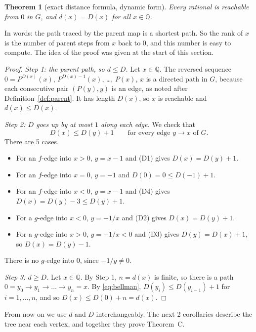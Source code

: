 \documentclass[11pt]{article}
\newtheorem{theorem}{Theorem}[section]
\theoremstyle{definition}
\theoremstyle{remark}
\newcommand{\Q}{\mathbb{Q}}
\begin{document}
\begin{theorem}[exact distance formula, dynamic form]\label{thm:dist}
Every rational is reachable from $0$ in $G$, and $d(x)=D(x)$ for all $x\in\Q$.
\end{theorem}

In words: the path traced by the parent map is a shortest path. So the rank of $x$ is the number of
parent steps from $x$ back to $0$, and this number is easy to compute. The idea of the proof was
given at the start of this section.

\begin{proof}
\emph{Step 1: the parent path, so $d\le D$.}
Let $x\in\Q$. The reversed sequence $0=P^{D(x)}(x)$, $P^{D(x)-1}(x)$, \dots, $P(x)$, $x$ is a
directed path in $G$, because each consecutive pair $(P(y),y)$ is an edge, as noted after
Definition~\ref{def:parent}. It has length $D(x)$, so $x$ is reachable and $d(x)\le D(x)$.

\emph{Step 2: $D$ goes up by at most $1$ along each edge.} We check that
\begin{equation}\label{eq:bellman}
D(x)\le D(y)+1 \qquad\text{for every edge } y\to x \text{ of } G .
\end{equation}
There are 5 cases.
\begin{itemize}[itemsep=0pt,topsep=2pt]
\item For an $f$-edge into $x>0$, $y=x-1$ and (D1) gives $D(x)=D(y)+1$.
\item For an $f$-edge into $x=0$, $y=-1$ and $D(0)=0\le D(-1)+1$.
\item For an $f$-edge into $x<0$, $y=x-1$ and (D4) gives $D(x)=D(y)-3\le D(y)+1$.
\item For a $g$-edge into $x<0$, $y=-1/x$ and (D2) gives $D(x)=D(y)+1$.
\item For a $g$-edge into $x>0$, $y=-1/x<0$ and (D3) gives $D(y)=D(x)+1$, so $D(x)=D(y)-1$.
\end{itemize}
There is no $g$-edge into $0$, since $-1/y\neq0$.

\emph{Step 3: $d\ge D$.} Let $x\in\Q$. By Step 1, $n=d(x)$ is finite, so there is a path
$0=y_0\to y_1\to\dots\to y_n=x$. By \eqref{eq:bellman}, $D(y_i)\le D(y_{i-1})+1$ for
$i=1,\dots,n$, and so $D(x)\le D(0)+n=d(x)$.
\end{proof}

From now on we use $d$ and $D$ interchangeably. The next 2 corollaries describe the tree near each
vertex, and together they prove Theorem~C.
\end{document}
